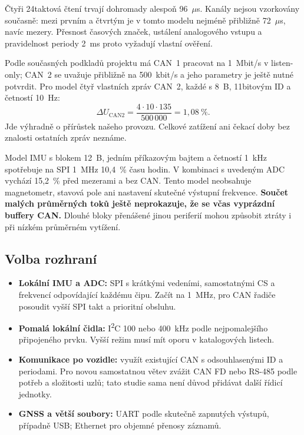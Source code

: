 \documentclass[11pt,a4paper]{article}
\begin{document}
Čtyři 24taktová čtení trvají dohromady alespoň 96~$\mu$s. Kanály nejsou vzorkovány současně: mezi prvním a čtvrtým je v tomto modelu nejméně přibližně 72~$\mu$s, navíc mezery. Přesnost časových značek, ustálení analogového vstupu a pravidelnost periody 2~ms proto vyžadují vlastní ověření.

Podle současných podkladů projektu má CAN~1 pracovat na 1~Mbit/s v listen-only; CAN~2 se uvažuje přibližně na 500~kbit/s a jeho parametry je ještě nutné potvrdit. Pro model čtyř vlastních zpráv CAN~2, každé s 8~B, 11bitovým ID a četností 10~Hz:
\begin{equation}
\Delta U_{\mathrm{CAN2}}=\frac{4\cdot10\cdot135}{500\,000}=1{,}08~\%.
\end{equation}
Jde výhradně o přírůstek našeho provozu. Celkové zatížení ani čekací doby bez znalosti ostatních zpráv neznáme.

Model IMU s blokem 12~B, jedním příkazovým bajtem a četností 1~kHz spotřebuje na SPI 1~MHz 10,4~\% času hodin. V kombinaci s uvedeným ADC vychází 15,2~\% před mezerami a bez CAN. Tento model neobsahuje magnetometr, stavová pole ani nastavení skutečné výstupní frekvence. \textbf{Součet malých průměrných toků ještě neprokazuje, že se včas vyprázdní buffery CAN.} Dlouhé bloky přenášené jinou periferií mohou způsobit ztráty i při nízkém průměrném vytížení.

\subsection{Volba rozhraní}
\begin{itemize}
\item \textbf{Lokální IMU a ADC:} SPI s krátkými vedeními, samostatnými CS a frekvencí odpovídající každému čipu. Začít na 1~MHz, pro CAN řadiče posoudit vyšší SPI takt a prioritní obsluhu.
\item \textbf{Pomalá lokální čidla:} I\textsuperscript{2}C 100 nebo 400~kHz podle nejpomalejšího připojeného prvku. Vyšší režim musí mít oporu v katalogových listech.
\item \textbf{Komunikace po vozidle:} využít existující CAN s odsouhlasenými ID a periodami. Pro novou samostatnou větev zvážit CAN FD nebo RS-485 podle potřeb a složitosti uzlů; tato studie sama není důvod přidávat další řídicí jednotky.
\item \textbf{GNSS a větší soubory:} UART podle skutečně zapnutých výstupů, případně USB; Ethernet pro objemné přenosy záznamů.
\end{itemize}
\end{document}
